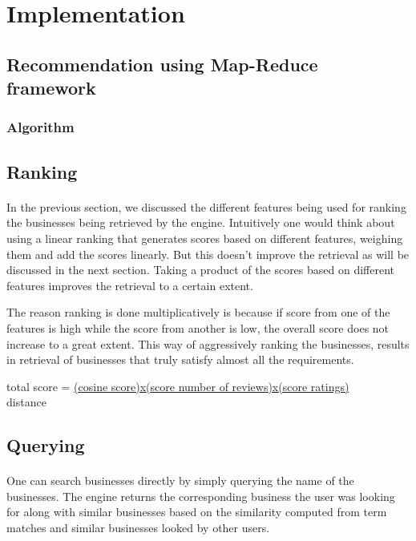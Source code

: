 \documentclass[paper=letter, fontsize=15pt]{article} %
\begin{document}
\section{Implementation}





\subsection{Recommendation using Map-Reduce framework}
\subsubsection{Algorithm}
\subsection{Ranking}
\paragraph{}In the previous section, we discussed the different features being used for ranking the businesses being retrieved by the engine. Intuitively one would think about using a linear ranking that generates scores based on different features, weighing them and add the scores linearly. But this doesn't improve the retrieval as will be discussed in the next section. Taking a product of the scores based on different features improves the retrieval to a certain extent. 

The reason ranking is done multiplicatively is because if score from one of the features is high while the score from another is low, the overall score does not increase to a great extent. This way of aggressively ranking the businesses, results in retrieval of businesses that truly satisfy almost all the requirements. 
\begin{center}
total score = \underline{(cosine score)x(score number of reviews)x(score ratings)}
                             \\  distance

\end{center}
\subsection{Querying}
\paragraph{}One can search businesses directly by simply querying the name of the businesses. The engine returns the corresponding business the user was looking for along with similar businesses based on the similarity computed from term matches and similar businesses looked by other users. 
\end{document}
